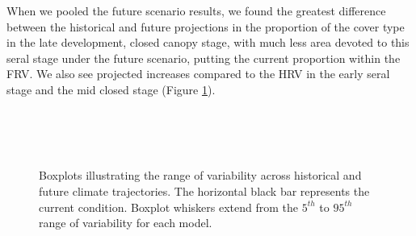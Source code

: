 When we pooled the future scenario results, we found the greatest difference between the historical and future projections in the proportion of the cover type in the late development, closed canopy stage, with much less area devoted to this seral stage under the future scenario, putting the current proportion within the FRV. We also see projected increases compared to the HRV in the early seral stage and the mid closed stage (Figure \ref{fig:covcond_rfrm}).

\begin{figure}[htbp]
  \centering
  \qquad
   \\
  \qquad
   \\
       \\
  \qquad
    \qquad
    \caption{Boxplots illustrating the range of variability across historical and future climate trajectories. The horizontal black bar represents the current condition. Boxplot whiskers extend from the $5^{th}$ to $95^{th}$ range of variability for each model. }
  \label{fig:covcond_rfrm}
\end{figure} %


